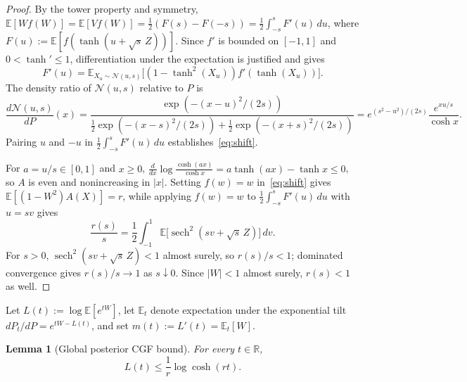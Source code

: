\documentclass[11pt]{article}
\theoremstyle{plain}
\newtheorem{lemma}[theorem]{Lemma}
\theoremstyle{definition}
\theoremstyle{remark}
\DeclareMathOperator{\sech}{sech}
\begin{document}
\begin{proof}
By the tower property and symmetry, $\mathbb{E}[W f(W)] = \mathbb{E}[V f(W)] = \frac{1}{2}(F(s) - F(-s)) = \frac{1}{2}\int_{-s}^s F'(u)\,du$, where $F(u) := \mathbb{E}[f(\tanh(u + \sqrt{s}\,Z))]$. Since $f'$ is bounded on $[-1, 1]$ and $0 < \tanh' \le 1$, differentiation under the expectation is justified and gives
\[
F'(u) = \mathbb{E}_{X_u \sim \mathcal{N}(u, s)}\bigl[(1 - \tanh^2(X_u)) f'(\tanh(X_u))\bigr].
\]
The density ratio of $\mathcal{N}(u, s)$ relative to $P$ is
\[
\frac{d\mathcal{N}(u, s)}{dP}(x)
= \frac{\exp(-(x-u)^2/(2s))}{\frac{1}{2}\exp(-(x-s)^2/(2s)) + \frac{1}{2}\exp(-(x+s)^2/(2s))}
= e^{(s^2 - u^2)/(2s)} \frac{e^{xu/s}}{\cosh x}.
\]
Pairing $u$ and $-u$ in $\frac{1}{2}\int_{-s}^s F'(u)\,du$ establishes~\eqref{eq:shift}.

For $a = u/s \in [0, 1]$ and $x \ge 0$, $\frac{d}{dx}\log\frac{\cosh(ax)}{\cosh x} = a\tanh(ax) - \tanh x \le 0$, so $A$ is even and nonincreasing in $|x|$. Setting $f(w) = w$ in~\eqref{eq:shift} gives $\mathbb{E}[(1 - W^2)A(X)] = r$, while applying $f(w) = w$ to $\frac{1}{2}\int_{-s}^s F'(u)\,du$ with $u = sv$ gives
\[
\frac{r(s)}{s} = \frac{1}{2}\int_{-1}^1 \mathbb{E}\bigl[\sech^2(sv + \sqrt{s}\,Z)\bigr]\,dv.
\]
For $s > 0$, $\sech^2(sv + \sqrt{s}\,Z) < 1$ almost surely, so $r(s)/s < 1$; dominated convergence gives $r(s)/s \to 1$ as $s \downarrow 0$. Since $|W| < 1$ almost surely, $r(s) < 1$ as well.
\end{proof}

Let $L(t) := \log \mathbb{E}[e^{tW}]$, let $\mathbb{E}_t$ denote expectation under the exponential tilt $dP_t/dP = e^{tW - L(t)}$, and set $m(t) := L'(t) = \mathbb{E}_t[W]$.

\begin{lemma}[Global posterior CGF bound]\label{lem:cgf}
For every $t \in \mathbb{R}$,
\begin{equation}\label{eq:cgf}
L(t) \le \frac{1}{r}\log\cosh(rt).
\end{equation}
\end{lemma}
\end{document}

